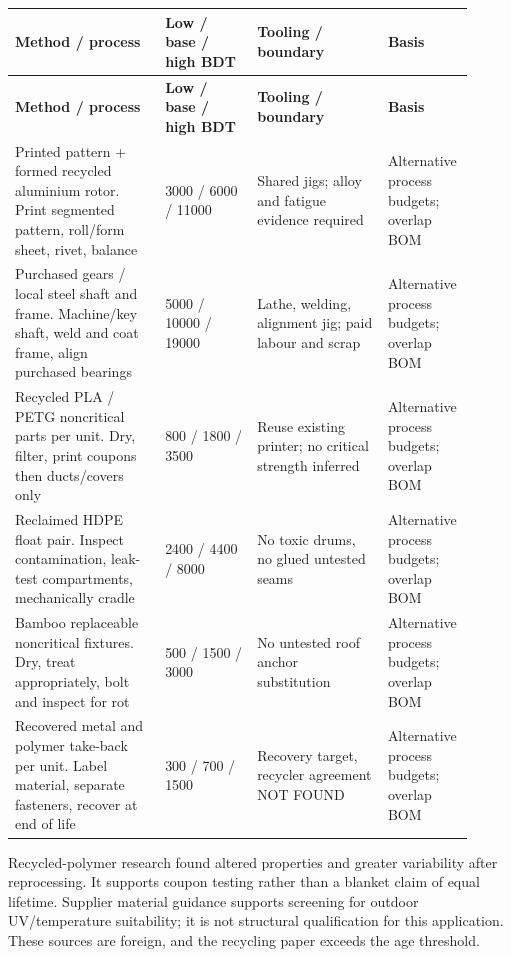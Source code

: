 \documentclass[11pt,a4paper]{article}
\begin{document}
{\small
\setlength{\tabcolsep}{3pt}\renewcommand{\arraystretch}{1.18}
\begin{longtable}{@{}>{\raggedright\arraybackslash}p{0.3193\linewidth}>{\raggedright\arraybackslash}p{0.1996\linewidth}>{\raggedright\arraybackslash}p{0.2714\linewidth}>{\raggedright\arraybackslash}p{0.1197\linewidth}@{}}
\toprule \textbf{Method / process} & \textbf{Low / base / high BDT} & \textbf{Tooling / boundary} & \textbf{Basis} \\ \midrule
\endfirsthead\toprule \textbf{Method / process} & \textbf{Low / base / high BDT} & \textbf{Tooling / boundary} & \textbf{Basis} \\ \midrule
\endhead\bottomrule\endfoot
Printed pattern + formed recycled aluminium rotor. Print segmented pattern, roll/form sheet, rivet, balance & \num{3000} / \num{6000} / \num{11000} & Shared jigs; alloy and fatigue evidence required & [A] Alternative process budgets; overlap BOM \\
Purchased gears / local steel shaft and frame. Machine/key shaft, weld and coat frame, align purchased bearings & \num{5000} / \num{10000} / \num{19000} & Lathe, welding, alignment jig; paid labour and scrap & [A] Alternative process budgets; overlap BOM \\
Recycled PLA / PETG noncritical parts per unit. Dry, filter, print coupons then ducts/covers only & \num{800} / \num{1800} / \num{3500} & Reuse existing printer; no critical strength inferred & [A] Alternative process budgets; overlap BOM \\
Reclaimed HDPE float pair. Inspect contamination, leak-test compartments, mechanically cradle & \num{2400} / \num{4400} / \num{8000} & No toxic drums, no glued untested seams & [A] Alternative process budgets; overlap BOM \\
Bamboo replaceable noncritical fixtures. Dry, treat appropriately, bolt and inspect for rot & \num{500} / \num{1500} / \num{3000} & No untested roof anchor substitution & [A] Alternative process budgets; overlap BOM \\
Recovered metal and polymer take-back per unit. Label material, separate fasteners, recover at end of life & \num{300} / \num{700} / \num{1500} & Recovery target, recycler agreement NOT FOUND & [A] Alternative process budgets; overlap BOM \\
\end{longtable}}
Recycled-polymer research found altered properties and greater variability after reprocessing. It supports coupon testing rather than a blanket claim of equal lifetime. Supplier material guidance supports screening for outdoor UV/temperature suitability; it is not structural qualification for this application. These sources are foreign, and the recycling paper exceeds the age threshold. \cite{recycle,materials,asa}
\end{document}
